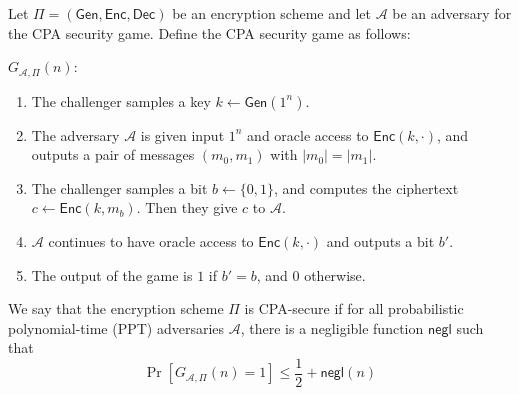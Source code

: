 \documentclass[11pt]{article}
\newcommand{\Gen}{\mathsf{Gen}}
\newcommand{\Enc}{\mathsf{Enc}}
\newcommand{\Dec}{\mathsf{Dec}}
\newcommand{\A}{\mathcal{A}}
\newcommand{\negl}{\mathsf{negl}}
\begin{document}
\begin{definition}\label{def:CPA-security-predicting-variant}
Let $\Pi = (\Gen, \Enc, \Dec)$ be an encryption scheme and let $\A$ be an adversary for the CPA security game. Define the CPA security game as follows:\newline

\noindent\underline{$G_{\A, \Pi}(n)$}:
\begin{enumerate}
    \item The challenger samples a key $k \leftarrow \Gen(1^n)$.
    \item The adversary $\A$ is given input $1^n$ and oracle access to $\Enc(k, \cdot)$, and outputs a pair of messages $(m_0, m_1)$ with $|m_0| = |m_1|$.
    \item The challenger samples a bit $b \leftarrow \{0,1\}$, and computes the ciphertext $c \leftarrow \Enc(k, m_b)$. Then they give $c$ to $\A$.
    \item $\A$ continues to have oracle access to $\Enc(k, \cdot)$ and outputs a bit $b'$.
    \item The output of the game is $1$ if $b' = b$, and $0$ otherwise.
\end{enumerate}

We say that the encryption scheme $\Pi$ is CPA-secure if for all probabilistic polynomial-time (PPT) adversaries $\A$, there is a negligible function $\negl$ such that 
\[\Pr\left[G_{\A, \Pi}(n) = 1\right] \leq \frac{1}{2} + \negl(n)\]    
\end{definition}
\end{document}
